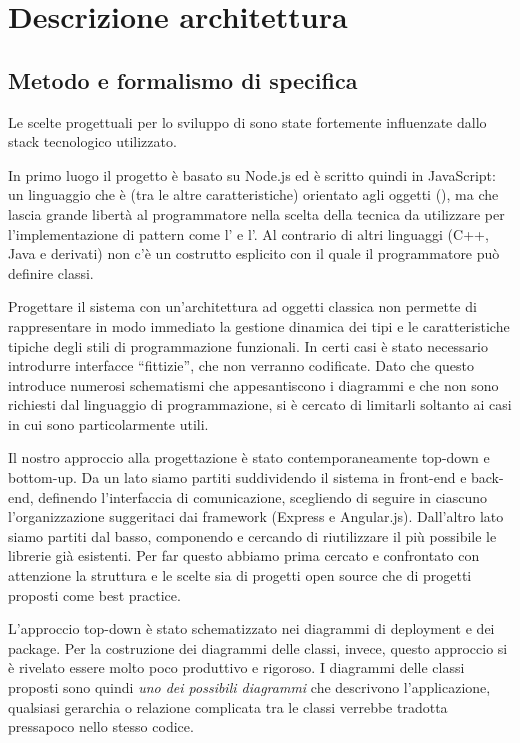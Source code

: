 \section{Descrizione architettura}

\subsection{Metodo e formalismo di specifica}

Le scelte progettuali per lo sviluppo di \ProjectName{} sono state fortemente influenzate dallo stack tecnologico utilizzato.

In primo luogo il progetto è basato su Node.js ed è scritto quindi in JavaScript: un linguaggio che è (tra le altre caratteristiche) orientato agli oggetti (), ma che lascia grande libertà al programmatore nella scelta della tecnica da utilizzare per l'implementazione di pattern come l' e l'. Al contrario di altri linguaggi (C++, Java e derivati) non c'è un costrutto esplicito con il quale il programmatore può definire classi. 

Progettare il sistema con un'architettura ad oggetti classica non permette di rappresentare in modo immediato la gestione dinamica dei tipi e le caratteristiche tipiche degli stili di programmazione funzionali. In certi casi è stato necessario introdurre interfacce ``fittizie'', che non verranno codificate. Dato che questo introduce numerosi schematismi che appesantiscono i diagrammi e che non sono richiesti dal linguaggio di programmazione, si è cercato di limitarli soltanto ai casi in cui sono particolarmente utili.

Il nostro approccio alla progettazione è stato contemporaneamente top-down e bottom-up. Da un lato siamo partiti suddividendo il sistema in front-end e back-end, definendo l'interfaccia di comunicazione, scegliendo di seguire in ciascuno l'organizzazione suggeritaci dai framework (Express e Angular.js). Dall'altro lato siamo partiti dal basso, componendo e cercando di riutilizzare il più possibile le librerie già esistenti. Per far questo abbiamo prima cercato e confrontato con attenzione la struttura e le scelte sia di progetti open source che di progetti proposti come best practice.

L'approccio top-down è stato schematizzato nei diagrammi di deployment e dei package. Per la costruzione dei diagrammi delle classi, invece, questo approccio si è rivelato essere molto poco produttivo e rigoroso. I diagrammi delle classi proposti sono quindi \emph{uno dei possibili diagrammi} che descrivono l'applicazione, qualsiasi gerarchia o relazione complicata tra le classi verrebbe tradotta pressapoco nello stesso codice.

